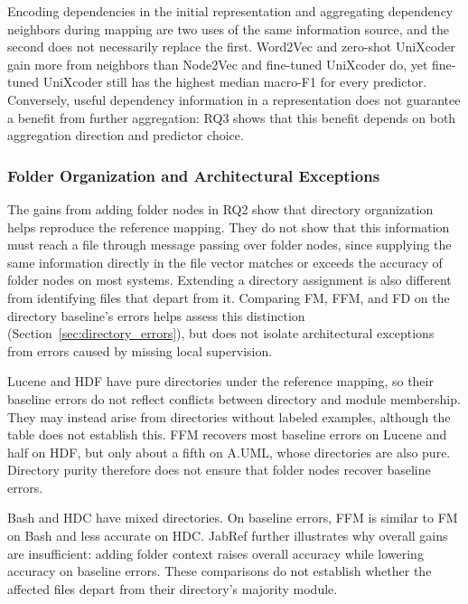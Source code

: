 Encoding dependencies in the initial representation and aggregating dependency neighbors during mapping are two uses of the same information source, and the second does not necessarily replace the first. Word2Vec and zero-shot UniXcoder gain more from neighbors than Node2Vec and fine-tuned UniXcoder do, yet fine-tuned UniXcoder still has the highest median macro-F1 for every predictor. Conversely, useful dependency information in a representation does not guarantee a benefit from further aggregation: RQ3 shows that this benefit depends on both aggregation direction and predictor choice.

\subsubsection*{Folder Organization and Architectural Exceptions}
The gains from adding folder nodes in RQ2 show that directory organization helps reproduce the reference mapping. They do not show that this information must reach a file through message passing over folder nodes, since supplying the same information directly in the file vector matches or exceeds the accuracy of folder nodes on most systems. Extending a directory assignment is also different from identifying files that depart from it. Comparing FM, FFM, and FD on the directory baseline's errors helps assess this distinction (Section~\ref{sec:directory_errors}), but does not isolate architectural exceptions from errors caused by missing local supervision.
 
Lucene and HDF have pure directories under the reference mapping, so their baseline errors do not reflect conflicts between directory and module membership. They may instead arise from directories without labeled examples, although the table does not establish this. FFM recovers most baseline errors on Lucene and half on HDF, but only about a fifth on A.UML, whose directories are also pure. Directory purity therefore does not ensure that folder nodes recover baseline errors.
 
Bash and HDC have mixed directories. On baseline errors, FFM is similar to FM on Bash and less accurate on HDC. JabRef further illustrates why overall gains are insufficient: adding folder context raises overall accuracy while lowering accuracy on baseline errors. These comparisons do not establish whether the affected files depart from their directory's majority module.
 
